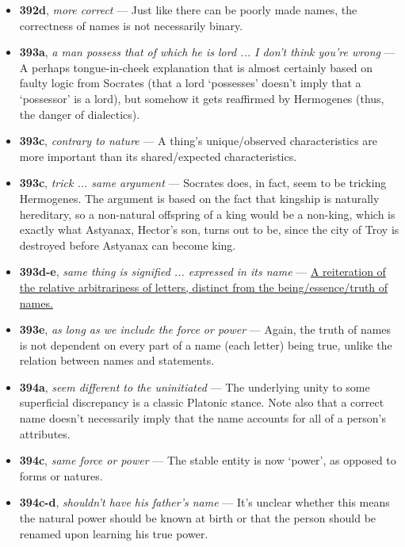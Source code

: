 \documentclass[12pt]{article}
\begin{document}
\begin{itemize}
\item \textbf{392d}, \textit{more correct} --- Just like there can be poorly made names, the correctness of names is not necessarily binary.

\item \textbf{393a}, \textit{a man possess that of which he is lord ... I don't think you're wrong} --- A perhaps tongue-in-cheek explanation that is almost certainly based on faulty logic from Socrates (that a lord `possesses' doesn't imply that a `possessor' is a lord), but somehow it gets reaffirmed by Hermogenes (thus, the danger of dialectics).

\item \textbf{393c}, \textit{contrary to nature} --- A thing's unique/observed characteristics are more important than its shared/expected characteristics.

\item \textbf{393c}, \textit{trick ... same argument} --- Socrates does, in fact, seem to be tricking Hermogenes. The argument is based on the fact that kingship is naturally hereditary, so a non-natural offspring of a king would be a non-king, which is exactly what Astyanax, Hector's son, turns out to be, since the city of Troy is destroyed before Astyanax can become king.

\item \textbf{393d-e}, \textit{same thing is signified ... expressed in its name} --- \ul{A reiteration of the relative arbitrariness of letters, distinct from the being/essence/truth of names.}

\item \textbf{393e}, \textit{as long as we include the force or power} --- Again, the truth of names is not dependent on every part of a name (each letter) being true, unlike the relation between names and statements.

\item \textbf{394a}, \textit{seem different to the uninitiated} --- The underlying unity to some superficial discrepancy is a classic Platonic stance. Note also that a correct name doesn't necessarily imply that the name accounts for all of a person's attributes.

\item \textbf{394c}, \textit{same force or power} --- The stable entity is now `power', as opposed to forms or natures.

\item \textbf{394c-d}, \textit{shouldn't have his father's name} --- It's unclear whether this means the natural power should be known at birth or that the person should be renamed upon learning his true power.


\end{itemize}
\end{document}
